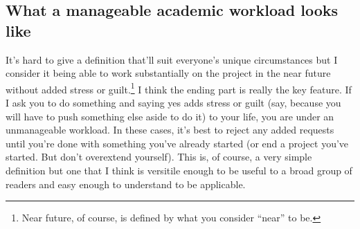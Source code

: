 \documentclass[
  12pt,
  openany]{book}
\begin{document}
\hypertarget{what-a-manageable-academic-workload-looks-like}{%
\subsection{What a manageable academic workload looks like}\label{what-a-manageable-academic-workload-looks-like}}

It's hard to give a definition that'll suit everyone's unique circumstances but I consider it being able to work substantially on the project in the near future without added stress or guilt.\footnote{Near future, of course, is defined by what you consider ``near'' to be.} I think the ending part is really the key feature. If I ask you to do something and saying yes adds stress or guilt (say, because you will have to push something else aside to do it) to your life, you are under an unmanageable workload. In these cases, it's best to reject any added requests until you're done with something you've already started (or end a project you've started. But don't overextend yourself). This is, of course, a very simple definition but one that I think is versitile enough to be useful to a broad group of readers and easy enough to understand to be applicable.
\end{document}
